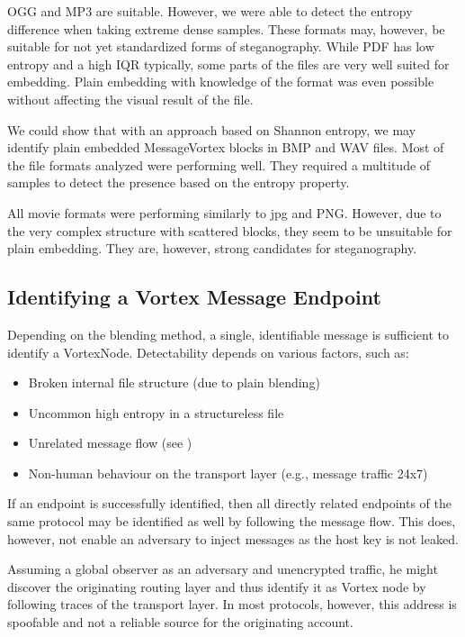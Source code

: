 OGG and MP3 are suitable. However, we were able to detect the entropy difference when taking extreme dense samples. These formats may, however, be suitable for not yet standardized forms of steganography. While PDF has low entropy and a high IQR typically, some parts of the files are very well suited for embedding. Plain embedding with knowledge of the format was even possible without affecting the visual result of the file.

We could show that with an approach based on Shannon entropy, we may identify plain embedded MessageVortex blocks in BMP and WAV files. Most of the file formats analyzed were performing well. They required a multitude of samples to detect the presence based on the entropy property.

All movie formats were performing similarly to jpg and PNG. However, due to the very complex structure with scattered blocks, they seem to be unsuitable for plain embedding. They are, however, strong candidates for steganography.

\subsection{Identifying a Vortex Message Endpoint}
Depending on the blending method, a single, identifiable message is sufficient to identify a VortexNode. Detectability depends on various factors, such as:

\begin{itemize}
	\item Broken internal file structure (due to plain blending)
	\item Uncommon high entropy in a structureless file
	\item Unrelated message flow (see \cite{oakland2013-parrot})
	\item Non-human behaviour on the transport layer (e.g., message traffic 24x7)
\end{itemize}

If an endpoint is successfully identified, then all directly related endpoints of the same protocol may be identified as well by following the message flow. This does, however, not enable an adversary to inject messages as the host key is not leaked. 

Assuming a global observer as an adversary and unencrypted traffic, he might discover the originating routing layer and thus identify it as Vortex node by following traces of the transport layer. In most protocols, however, this address is spoofable and not a reliable source for the originating account.

